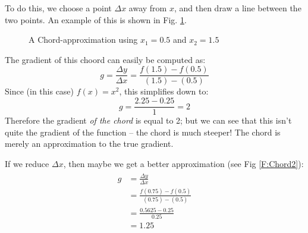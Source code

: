 \documentclass[a4paper,openany,11pt]{book}
\begin{document}
					To do this, we choose a point $\Delta x$ away from $x$, and then draw a line between the two points.  An example of this is shown in Fig. \ref{F:Chord1}.
					\begin{figure}
						\begin{center}
						\end{center}
						\caption{\small A Chord-approximation using $x_1 = 0.5$ and $x_2 = 1.5$}\label{F:Chord1}
					\end{figure}
						The gradient of this choord can easily be computed as:
						\begin{equation}
							g = \frac{\Delta y}{\Delta x} = \frac{f(1.5) - f(0.5)}{(1.5) - (0.5)}
						\end{equation}
						Since (in this case) $f(x) = x^2$, this simplifies down to:
						\begin{equation}
							g = \frac{2.25 - 0.25}{1} =2
						\end{equation}
						Therefore the gradient \textit{of the chord} is equal to 2; but we can see that this isn't quite the gradient of the function -- the chord is much steeper! The chord is merely an approximation to the true gradient.
						

						If we reduce $\Delta x$, then maybe we get a better approximation (see Fig \ref{F:Chord2}):
						\begin{align}
							\begin{split}
							g & = \frac{\Delta y}{\Delta x} 
							\\
							& = \frac{f(0.75) - f(0.5)}{(0.75) - (0.5)}
							\\
							& = \frac{0.5625 - 0.25}{0.25}
							\\
							& = 1.25
							\end{split}
						\end{align}
\end{document}
